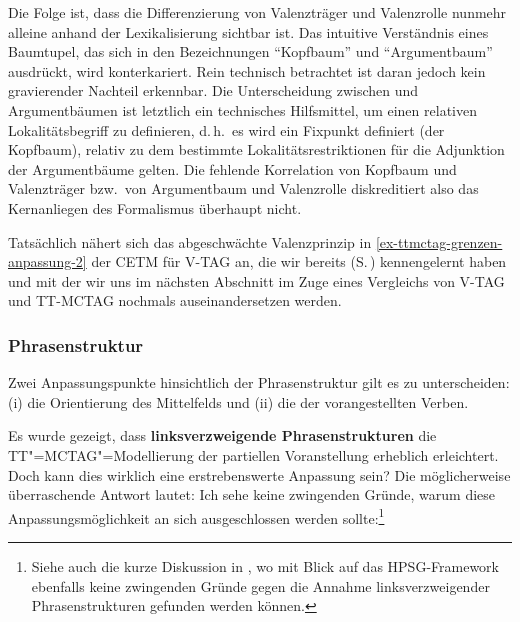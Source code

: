 Die Folge ist, dass die Differenzierung von Valenzträger und Valenzrolle nunmehr alleine anhand der Lexikalisierung sichtbar ist. Das intuitive Verständnis eines Baumtupel, das sich in den Bezeichnungen "`Kopfbaum"' und "`Argumentbaum"' ausdrückt, wird konterkariert. Rein technisch betrachtet ist daran jedoch kein gravierender Nachteil erkennbar. Die Unterscheidung zwischen  und Argumentbäumen ist letztlich ein technisches Hilfsmittel, um einen relativen Lokalitätsbegriff zu definieren, d.\,h.\ es wird ein Fixpunkt definiert (der Kopfbaum), relativ zu dem bestimmte Lokalitätsrestriktionen für die Adjunktion der Argumentbäume gelten. Die fehlende Korrelation von Kopfbaum und Valenzträger bzw.\ von Argumentbaum und Valenzrolle diskreditiert also das Kernanliegen des Formalismus überhaupt nicht. 

Tatsächlich nähert sich das abgeschwächte Valenzprinzip in \ref{ex-ttmctag-grenzen-anpassung-2} der CETM für V-TAG an, die wir bereits (S.\,\pageref{sec-tag-varianten-vtag}) kennengelernt haben und mit der wir uns im nächsten Abschnitt im Zuge eines Vergleichs von V-TAG und TT-MCTAG nochmals auseinandersetzen werden.  


 

\subsubsection*{Phrasenstruktur}

Zwei Anpassungspunkte hinsichtlich der Phrasenstruktur gilt es zu unterscheiden: (i) die Orientierung des Mittelfelds und (ii) die  der vorangestellten Verben.

Es wurde gezeigt, dass {\bf linksverzweigende Phrasenstrukturen} die TT"=MCTAG"=Modellierung der partiellen Voranstellung erheblich erleichtert. Doch kann dies wirklich eine erstrebenswerte Anpassung sein? Die möglicherweise überraschende Antwort lautet: Ich sehe keine zwingenden Gründe, warum diese Anpassungsmöglichkeit an sich ausgeschlossen werden sollte:\footnote{Siehe auch die kurze Diskussion in \cite{Crysmann:03}, wo mit Blick auf das HPSG-Framework ebenfalls keine zwingenden Gründe gegen die Annahme linksverzweigender Phrasenstrukturen gefunden werden können.}


